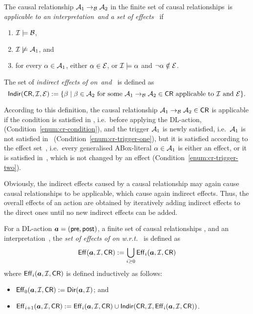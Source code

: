 \begin{definition}\label{def:indirect-effects}
    The causal relationship $\mathcal{A}_1\to_{\mathcal{B}}\mathcal{A}_2$ in the finite set of
    causal relationships~\CR is \emph{applicable to an interpretation~\Imc and a
    set of effects~\Emc} if
    \begin{enumerate}
        \item\label{enum:cr-condition}
            $\mathcal{I}\models\mathcal{B}$,
        \item\label{enum:cr-trigger-one}
            $\mathcal{I}\not\models\mathcal{A}_1$, and
        \item\label{enum:cr-trigger-two}
            for every $\alpha\in\mathcal{A}_1$, either $\alpha\in\mathcal{E}$, or
            $\mathcal{I}\models\alpha$ and $\lnot\alpha\notin\mathcal{E}$.
    \end{enumerate}
    The set of \emph{indirect effects of \CR on~\Imc and~\Emc} is defined as
    \[\Indir(\CR,\Imc,\Emc):=\{\beta\mid%
        \beta\in\Amc_2\text{ for some $\causes{\Amc_1}{\Amc_2}{\Bmc}\in\CR$
        applicable to~\Imc and~\Emc}\}.\]
\end{definition}

\noindent
According to this definition, the causal relationship
$\mathcal{A}_1\to_{\mathcal{B}}\mathcal{A}_2\in\mathsf{CR}$ is applicable if the condition \Bmc is
satisfied in \Imc, i.e.~before applying the DL-action,
(Condition~\ref{enum:cr-condition}), and the trigger $\mathcal{A}_1$ is newly
satisfied, i.e.~$\mathcal{A}_1$ is not satisfied in~\Imc
(Condition~\ref{enum:cr-trigger-one}), but it is satisfied according to the
effect set~\Emc, i.e.~every generalised ABox-literal $\alpha\in\mathcal{A}_1$ is either
an effect, or it is satisfied in~\Imc, which is not changed by an effect
(Condition~\ref{enum:cr-trigger-two}).

Obviously, the indirect effects caused by a causal relationship may again cause
causal relationships to be applicable, which cause again indirect effects.
Thus, the overall effects of an action are obtained by iteratively adding
indirect effects to the direct ones until no new indirect effects can be added.

\begin{definition}[Effects]\label{def:effects}
    For a DL-action $\boldsymbol a=(\mathsf{pre},\mathsf{post})$, a finite set of causal
    relationships \CR, and an interpretation~\Imc, the \emph{set of effects of
    \abf on \Imc w.r.t.~\CR} is defined as
    \[\operatorname{\mathsf{Eff}}(\boldsymbol a,\mathcal{I},\mathsf{CR}):=\bigcup_{i\ge 0}\operatorname{\mathsf{Eff}}_i(\boldsymbol a,\mathcal{I},\mathsf{CR})\]
    where $\operatorname{\mathsf{Eff}}_i(\boldsymbol a,\mathcal{I},\mathsf{CR})$ is defined inductively as follows:
    \begin{itemize}
        \item $\operatorname{\mathsf{Eff}}_0(\boldsymbol a,\mathcal{I},\mathsf{CR}):=\operatorname{\mathsf{Dir}}(\boldsymbol a,\mathcal{I})$; and
        \item
            $\operatorname{\mathsf{Eff}}_{i+1}(\boldsymbol a,\mathcal{I},\mathsf{CR}):=\operatorname{\mathsf{Eff}}_i(\boldsymbol a,\mathcal{I},\mathsf{CR})\cup\operatorname{\mathsf{Indir}}(\mathsf{CR},\mathcal{I},\operatorname{\mathsf{Eff}}_i(\boldsymbol a,\mathcal{I},\mathsf{CR}))$.
    \end{itemize}
\end{definition}

